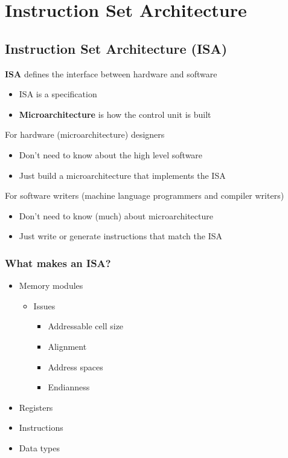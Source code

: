 \section{Instruction Set Architecture}
\subsection{Instruction Set Architecture (ISA)}
\textbf{ISA} defines the interface between hardware and software
\begin{itemize}
	\item ISA is a specification
	\item \textbf{Microarchitecture} is how the control unit is built	
\end{itemize}
For hardware (microarchitecture) designers
\begin{itemize}
	\item Don't need to know about the high level software
	\item Just build a microarchitecture that implements the ISA
\end{itemize}
For software writers (machine language programmers and compiler writers)
\begin{itemize}
	\item Don't need to know (much) about microarchitecture
	\item Just write or generate instructions that match the ISA
\end{itemize}

\subsubsection{What makes an ISA?}
\begin{itemize}
	\item Memory modules
	\begin{itemize}
		\item Issues
		\begin{itemize}
			\item Addressable cell size
			\item Alignment
			\item Address spaces
			\item Endianness
		\end{itemize}
	\end{itemize}
	\item Registers
	\item Instructions
	\item Data types	
\end{itemize}

